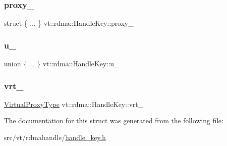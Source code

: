 \subsubsection{\texorpdfstring{proxy\+\_\+}{proxy\_}}
{\footnotesize\ttfamily struct \{ ... \}   vt\+::rdma\+::\+Handle\+Key\+::proxy\+\_\+}

\mbox{\label{structvt_1_1rdma_1_1_handle_key_a589ac313252f97d907c2c03a000130f7}} 
\subsubsection{\texorpdfstring{u\+\_\+}{u\_}}
{\footnotesize\ttfamily union \{ ... \}   vt\+::rdma\+::\+Handle\+Key\+::u\+\_\+}

\mbox{\label{structvt_1_1rdma_1_1_handle_key_a8f7eb5fab7d65601e5a541797299bb83}} 
\subsubsection{\texorpdfstring{vrt\+\_\+}{vrt\_}}
{\footnotesize\ttfamily \hyperlink{namespacevt_a1b417dd5d684f045bb58a0ede70045ac}{Virtual\+Proxy\+Type} vt\+::rdma\+::\+Handle\+Key\+::vrt\+\_\+}



The documentation for this struct was generated from the following file\+:\begin{DoxyCompactItemize}
\item 
src/vt/rdmahandle/\hyperlink{handle__key_8h}{handle\+\_\+key.\+h}\end{DoxyCompactItemize}
